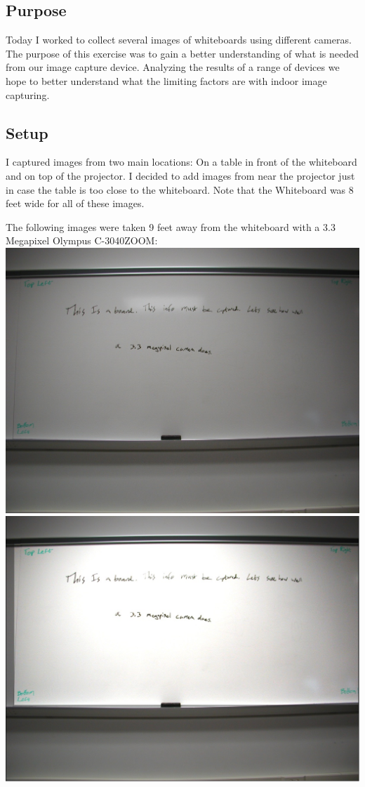 \documentclass[]{article}
\begin{document}
		\subsection{Purpose}
		Today I worked to collect several images of whiteboards using different cameras. The purpose of this exercise was to gain a better understanding of what is needed from our image capture device. Analyzing the results of a range of devices we hope to better understand what the limiting factors are with indoor image capturing. \\
		\subsection{Setup}
		I captured images from two main locations: On a table in front of the whiteboard and on top of the projector. I decided to add images from near the projector just in case the table is too close to the whiteboard.
		Note that the Whiteboard was 8 feet wide for all of these images.
		
		The following images were taken 9 feet away from the whiteboard with a 3.3 Megapixel Olympus C-3040ZOOM: \\
		
		\includegraphics{images/UnmodifiedClose.jpg} \\
		\includegraphics{images/ModifiedClose.jpg} \\
		
\end{document}
